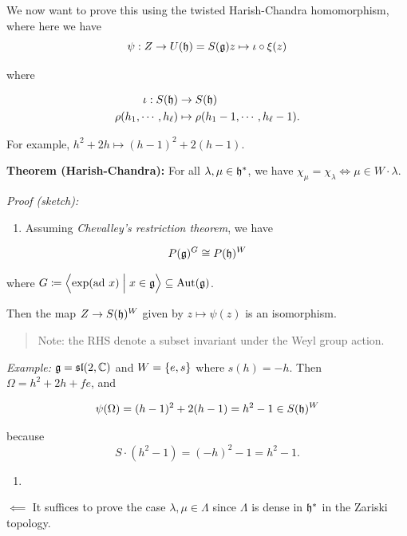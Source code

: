 We now want to prove this using the twisted Harish-Chandra homomorphism,
where here we have \[
\psi: Z \to U({\mathfrak{h}}) = S({\mathfrak{g}}) \\
z \mapsto \iota \circ \xi(z)
\]

where

\begin{align*}
\iota: S({\mathfrak{h}}) &\to S({\mathfrak{h}}) \\
\rho(h_1, \cdots, h_\ell) &\mapsto \rho(h_1-1, \cdots, h_\ell - 1)
.\end{align*}

For example, \(h^2 + 2h \mapsto (h-1)^2 + 2(h-1)\).

\textbf{Theorem (Harish-Chandra):} For all \(\lambda, \mu \in {\mathfrak{h}}^*\),
we have \(\chi_\mu = \chi_\lambda \iff \mu \in W \cdot \lambda\).

\emph{Proof (sketch):}

\begin{enumerate}
\def\labelenumi{\arabic{enumi}.}
\tightlist
\item
  Assuming \emph{Chevalley's restriction theorem}, we have
\end{enumerate}

\begin{align*}
P({\mathfrak{g}})^G \cong P({\mathfrak{h}})^W
\end{align*}

where
\(G \coloneqq \left\langle{\exp(\mathrm{ad}~x) \mathrel{\Big|}x\in {\mathfrak{g}}}\right\rangle \subseteq \mathrm{Aut}({\mathfrak{g}})\).

Then the map \(Z \to S({\mathfrak{h}})^W\) given by \(z \mapsto \psi(z)\) is an
isomorphism.

\begin{quote}
Note: the RHS denote a subset invariant under the Weyl group action.
\end{quote}

\emph{Example:} \({\mathfrak{g}} = {\mathfrak{sl}}(2, {\mathbb{C}})\) and \(W = \left\{{e, s}\right\}\)
where \(s(h) = -h\). Then \(\Omega = h^2 + 2h + fe\), and

\[
\psi(\Omega) = (h-1)^2 + 2(h-1) = h^2-1 \in S({\mathfrak{h}})^W
\]

because \[
S \cdot (h^2-1) = (-h)^2 - 1 = h^2 - 1
.\]

\begin{enumerate}
\def\labelenumi{\arabic{enumi}.}
\setcounter{enumi}{1}
\tightlist
\item
\end{enumerate}

\(\impliedby\) It suffices to prove the case
\(\lambda, \mu \in \Lambda\) since \(\Lambda\) is dense in \({\mathfrak{h}}^*\)
in the Zariski topology.

